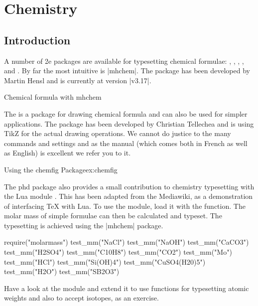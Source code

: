 \chapter{Chemistry}

\section{Introduction}

A number of \latex2e packages are available for typesetting chemical formulae: , , , ,  and  . By far the most intuitive is |mhchem|. The package has been developed by Martin Hensl and is currently at version |v3.17|.

\begin{texexample}{Chemical formula with mhchem}{}
\end{texexample}

The  is a package for drawing chemical formula and can also be used for simpler applications. The package has been developed by Christian Tellechea and is using TikZ for the actual drawing operations. We cannot do justice to the many commands and settings and as the manual (which comes both in French as well as English) is excellent we refer you to it.

\begin{texexample}{Using the chemfig Package}{ex:chemfig}
\end{texexample}

The phd package also provides a small contribution to chemistry typesetting with the Lua module . This has been adapted from the Mediawiki, as a demonstration of interfacing TeX with Lua. To use the module, load it with the  function. The molar mass of simple formulae can then be calculated and typeset. The typesetting is achieved using the |mhchem| package.

\begin{texexample}{}{}
\begin{luacode}
   require("molarmass")
   test_mm("NaCl")
   test_mm("NaOH")
   test_mm("CaCO3")
   test_mm("H2SO4")
   test_mm("C10H8")
   test_mm("CO2")
   test_mm("Mo")
   test_mm("HCl")
   test_mm("Si(OH)4")
   test_mm("CuSO4(H20)5")
   test_mm("H2O")
   test_mm("SB2O3")
\end{luacode}
\end{texexample}

Have a look at the module and extend it to use functions for typesetting atomic weights and also to accept isotopes, as an exercise.





